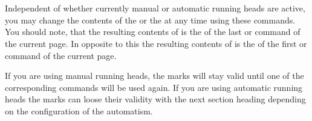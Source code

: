 \begin{Declaration}
  \\
  \\
\end{Declaration}
%
%
%
Independent of whether currently manual or automatic running heads are active,
you may change the contents of the  or the 
at any time using these commands. You should note, that the resulting contents
of  is the  of the last  or  command of the
current page. In opposite to this the resulting contents of
 is the  of the first
 or  command of the current page.

If you are using manual running heads, the marks will stay valid until one of
the corresponding commands will be used again. If you are using automatic
running heads the marks can loose their validity with the next section heading
depending on the configuration of the automatism.

